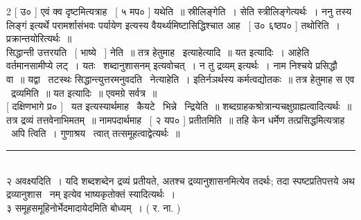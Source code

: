 \documentclass[11pt, openany]{book}
\begin{document}
\begin{multicols}{2}
 [ उ० ] एवं क्व दृष्टमित्यत्राह \textendash\ [ ५ मप० ] यथेति~॥ स्रीलिङ्गेति~। सेति स्त्रीलिङ्गेत्यर्थः~। ननु तस्य लिङ्गं इत्यर्थे परामर्शासंभवः {\qt पर्यायेण} इत्यस्य वैयर्थ्यमिष्टासिद्धिश्चात आह \textendash\ [ उ० ६ष्ठप० ] तथोरिति~। प्रक्रान्तयोरित्यर्थः~॥\\

सिद्धान्ती उत्तरयति \textendash\ [ भाष्ये \textendash\ ] नेति~॥ तत्र हेतुमाह \textendash\ इत्याहेत्यादि~॥ यत इत्यादिः~। आहेति वर्तमानसामीप्ये लट्~। यतः \textendash\ {\qt शब्दानुशासनम्} इत्यवोचत्~। न तु द्रव्यम् इत्यर्थः~। नाम निश्चये प्रसिद्धौ वा~॥ यद्वा \textendash\ तटस्थः सिद्धान्त्युत्तरमनुवदति \textendash\ नेत्याहेति~। इतिर्नञर्थस्य कर्मत्वद्योतकः~॥ तत्र हेतुमाह स एव \textendash\ द्रव्यमिति~॥ यत इत्यादिः~॥ एवमग्रे सर्वत्र~॥\\

 [ दक्षिणभागे प्र० ] \textendash\ यत इत्यस्यार्थमाह \textendash\ कैयटे \textendash\ भिन्ने \textendash\ न्द्रियेति~॥ शब्दग्राहकश्रोत्रान्यचक्षुग्राह्यत्वादित्यर्थः~॥ तत्र द्रव्यं तत्तवेनाभिमतम्~॥ नामपदार्थमाह \textendash\ [ २ यप० ] प्रतीतमिति~॥ तहि केन धर्मेण तत्प्रसिद्धमित्यत्राह \textendash\ अपि त्विति~। गुणाश्रय \textendash\ त्वात् तत्समूहत्वाद्वेत्यर्थः~॥

\noindent
\rule{1\linewidth}{0.5pt}\\

२ अवक्ष्यदिति~। यदि शब्दशब्देन द्रव्यं प्रतीयते, अतश्च द्रव्यानुशासनमित्येव तदर्थः; तदा स्पष्टप्रतिपत्तये अथ द्रव्यानुशास \textendash\ नम् इत्येव भाष्यकृतोक्तं स्यादित्यर्थः~।\\

३ समूहसमूहिनोर्भेदमादायेदमिति बोध्यम्~। ( र. ना. ) 
\end{multicols}
\end{document}
